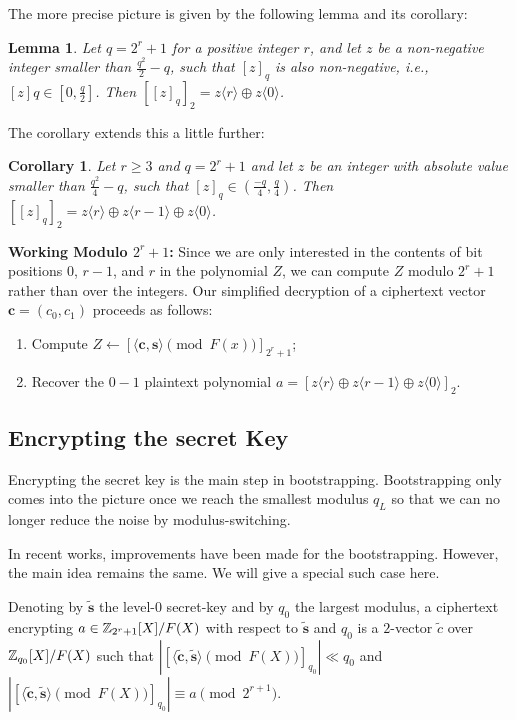 \documentclass[12pt]{article}
\theoremstyle{plain}
\newtheorem{corollary}{Corollary}
\newtheorem{lemma}{Lemma}
\theoremstyle{definition}
\theoremstyle{remark}
\begin{document}
The more precise picture is given by the following lemma and its corollary:
\begin{lemma}
Let $q = 2^r + 1$ for a positive integer $r$, and let $z$ be a non-negative integer
smaller than $\frac{q^2}{2}-q$, such that $[z]_q$ is also non-negative, i.e., $[z]q \in [0, \frac{q}{2}]$.  Then $[[z]_q]_2=z\langle r \rangle\oplus z\langle 0 \rangle$. \end{lemma}
The corollary extends this a little further:
\begin{corollary}
Let $r\geq 3$ and $q = 2^r+1$ and let $z$ be an integer with absolute value
smaller than $\frac{q^2}{4}-q$, such that $[z]_q \in (\frac{-q}{4}, \frac{q}{4})$. Then $[[z]_q]_2=z\langle r \rangle\oplus z\langle r-1 \rangle \oplus z\langle 0 \rangle$.
\end{corollary}

{ \bf Working Modulo $2^r+1$:} Since we are only interested in the contents of bit positions $0$, $r-1$, and $r$ in the polynomial $Z$, we can compute $Z$ modulo $2^r+1$ rather than over the integers. Our simplified decryption of a ciphertext vector $\mathbf{c} = (c_0, c_1)$ proceeds as
follows:
\begin{enumerate}
    \item Compute $Z \leftarrow [\langle\mathbf{c}, \mathbf{s}\rangle \pmod{F(x)}]_{2^r+1}$;
    \item Recover the $0-1$ plaintext polynomial $a =[z\langle r \rangle\oplus z\langle r-1 \rangle \oplus z\langle 0 \rangle]_2$.
\end{enumerate}

\subsection{Encrypting the secret Key} 
 Encrypting the secret key is the main step in bootstrapping. Bootstrapping only comes into the picture once we reach the smallest modulus $q_L$ so that we can no longer reduce the noise by modulus-switching.  
 
 In recent works, improvements have been made for the bootstrapping. However, the main idea remains the same. We will give a special such case here.
 
Denoting by $\tilde{\mathbf{s}}$ the level-$0$ secret-key and by $q_0$ the largest
modulus, a ciphertext encrypting $a \in \mathbb{Z}_{2^r+1}[X]/F(X)$ with respect to $\tilde{\mathbf{s}}$ and $q_0$ is a $2$-vector $\tilde{c}$ over $\mathbb{Z}_{q_0}[X]/F(X)$ such that $|[\langle \tilde{\mathbf{c}},\tilde{\mathbf{s}}\rangle \pmod{F(X)}]_{q_0}| \ll q_0$ and  $|[\langle \tilde{\mathbf{c}},\tilde{\mathbf{s}}\rangle \pmod{F(X)}]_{q_0}| \equiv a \pmod{2^{r+1}}$.
\end{document}
